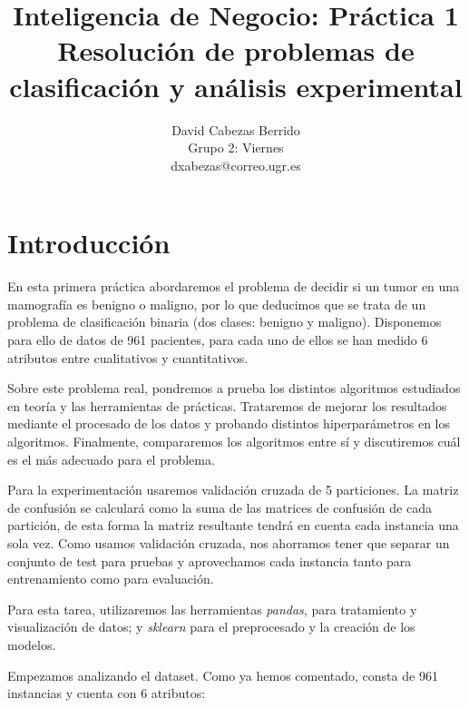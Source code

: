 \documentclass{article}
\title{\Huge Inteligencia de Negocio: Práctica 1 \\ Resolución de problemas
  de clasificación y análisis experimental\vspace{10mm}}
\author{\huge David Cabezas Berrido \vspace{10mm} \\ 
  \huge Grupo 2: Viernes \vspace{10mm} \\ \huge dxabezas@correo.ugr.es \vspace{10mm}}
\begin{document}
\maketitle
\newpage
\tableofcontents
\newpage

\section{Introducción}

En esta primera práctica abordaremos el problema de decidir si un
tumor en una mamografía es benigno o maligno, por lo que deducimos que
se trata de un problema de clasificación binaria (dos clases: benigno
y maligno). Disponemos para ello de datos de 961 pacientes, para cada
uno de ellos se han medido 6 atributos entre cualitativos y
cuantitativos.

Sobre este problema real, pondremos a prueba los distintos algoritmos
estudiados en teoría y las herramientas de prácticas. Trataremos de
mejorar los resultados mediante el procesado de los datos y
probando distintos hiperparámetros en los algoritmos. Finalmente,
compararemos los algoritmos entre sí y discutiremos cuál es el más
adecuado para el problema.

Para la experimentación usaremos validación cruzada de 5
particiones. La matriz de confusión se calculará como la suma de las
matrices de confusión de cada partición, de esta forma la matriz
resultante tendrá en cuenta cada instancia una sola vez. Como usamos
validación cruzada, nos ahorramos tener que separar un conjunto de
test para pruebas y aprovechamos cada instancia tanto para
entrenamiento como para evaluación.

Para esta tarea, utilizaremos las herramientas \textit{pandas}, para
tratamiento y visualización de datos; y \textit{sklearn} para el
preprocesado y la creación de los modelos.

Empezamos analizando el dataset. Como ya hemos comentado, consta de
961 instancias y cuenta con 6 atributos: 
\end{document}
